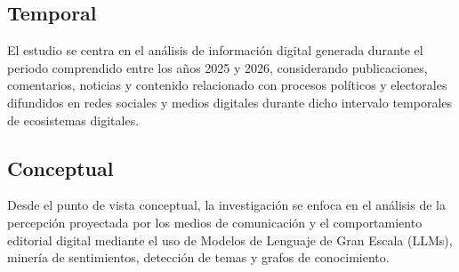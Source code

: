 \subsection{Temporal}

El estudio se centra en el análisis de información digital generada durante el periodo comprendido entre los años 2025 y 2026, considerando publicaciones, comentarios, noticias y contenido relacionado con procesos políticos y electorales difundidos en redes sociales y medios digitales durante dicho intervalo temporales de ecosistemas digitales.

\subsection{Conceptual}

Desde el punto de vista conceptual, la investigación se enfoca en el análisis de la percepción proyectada por los medios de comunicación y el comportamiento editorial digital mediante el uso de Modelos de Lenguaje de Gran Escala (LLMs), minería de sentimientos, detección de temas y grafos de conocimiento.